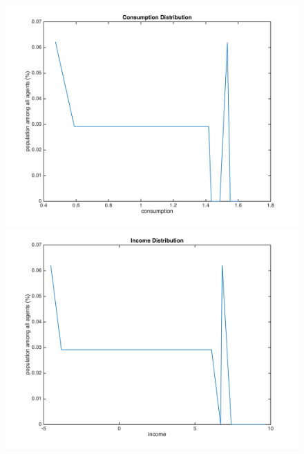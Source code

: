 \documentclass{article}[a4paper]
\begin{document}
\begin{figure}[htbp]
\centering
\begin{minipage}[t]{0.48\textwidth}
\includegraphics[width=\textwidth]{img/1consumdist.png}
\end{minipage}

\begin{minipage}[t]{0.48\textwidth}
\centering
\includegraphics[width=\textwidth]{img/1incomedist.png}
\end{minipage}


\end{figure}
\end{document}
